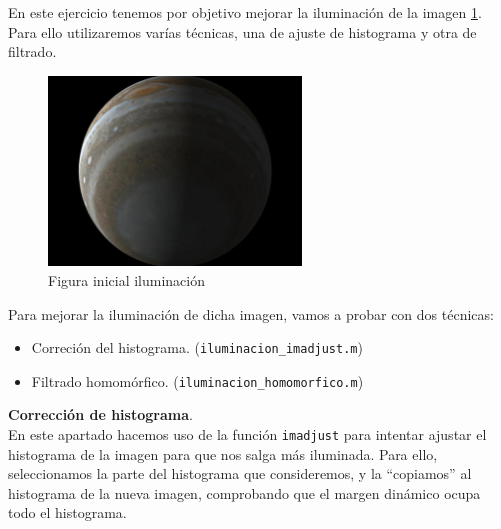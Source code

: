 \documentclass[12pt]{article}
\begin{document}
	\noindent En este ejercicio tenemos por objetivo mejorar la iluminación de la imagen \ref{img: iluminacion src}. Para ello utilizaremos varías técnicas, una de ajuste de histograma y otra de filtrado.
	
	\begin{figure}[h]
		\begin{center}
			\includegraphics[width=0.6\textwidth]{img/iluminacion.jpg}
			\caption{Figura inicial iluminación}
			\label{img: iluminacion src}
		\end{center}
	\end{figure}

	\noindent Para mejorar la iluminación de dicha imagen, vamos a probar con dos técnicas:
	\begin{itemize}
		\item Correción del histograma. (\texttt{iluminacion\_imadjust.m})
		\item Filtrado homomórfico.
		(\texttt{iluminacion\_homomorfico.m})
	\end{itemize}

	\vspace{10px}

	\noindent \textbf{\large Corrección de histograma}. \\ 
	
	\noindent En este apartado hacemos uso de la función \texttt{imadjust} para intentar ajustar el histograma de la imagen para que nos salga más iluminada. Para ello, seleccionamos la parte del histograma que consideremos, y la ``copiamos'' al histograma de la nueva imagen, comprobando que el margen dinámico ocupa todo el histograma.\\
	
\end{document}
